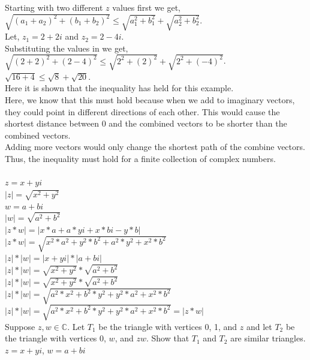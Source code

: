 \documentclass[12pt]{article}
\begin{document}
Starting with two different $z$ values first we get, 
$\sqrt{(a_1 + a_2)^2 + (b_1 + b_2)^2} \leq \sqrt{a_1^2 + b_1^2} + \sqrt{a_2^2 + b_2^2}$.\\

Let, $z_1 = 2 + 2i$ and $z_2 = 2 - 4i$.\\

Substituting the values in we get, $\sqrt{(2 + 2)^2 + (2 - 4)^2} \le \sqrt{2^2 + (2)^2} + \sqrt{2^2 + (-4)^2}$.\\
$\sqrt{16 + 4} \le \sqrt{8} + \sqrt{20}$.\\
Here it is shown that the inequality has held for this example.\\



Here, we know that this must hold because when we add to imaginary vectors, they could point in different directions of each other. 
This would cause the shortest distance between 0 and the combined vectors to be shorter than the combined vectors.\\

Adding more vectors would only change the shortest path of the combine vectors.\\

Thus, the inequality must hold for a finite collection of complex numbers.\\


\\
$z = x + yi$\\
$|z| = \sqrt{x^2 + y^2}$\\
$w = a + bi$\\
$|w| = \sqrt{a^2 + b^2}$\\

$|z * w| = |x*a + a*yi + x*bi - y*b|$\\
$|z * w| = \sqrt{x^2*a^2 + y^2*b^2 + a^2*y^2 + x^2*b^2}$\\

$|z| * |w| = |x + yi| * |a + bi|$\\
$|z| * |w| = \sqrt{x^2 + y^2} * \sqrt{a^2 + b^2}$\\
$|z| * |w| = \sqrt{x^2 + y^2} * \sqrt{a^2 + b^2}$\\
$|z| * |w| = \sqrt{a^2*x^2 + b^2*y^2 + y^2*a^2 + x^2*b^2}$\\
$|z| * |w| = \sqrt{a^2*x^2 + b^2*y^2 + y^2*a^2 + x^2*b^2} =  |z * w|$\\

 Suppose $z,w \in \mathbb{C}$. Let $T_1$ be the triangle with vertices 0, 1, and $z$ and let $T_2$ be the triangle with vertices 0, $w$, and $zw$. Show that $T_1$ and $T_2$ are similar triangles.\\
$z = x + yi$,
$w = a + bi$\\
\end{document}
